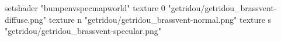 setshader "bumpenvspecmapworld"
texture 0 "getridou/getridou_brassvent-diffuse.png"
texture n "getridou/getridou_brassvent-normal.png"
texture s "getridou/getridou_brassvent-specular.png"